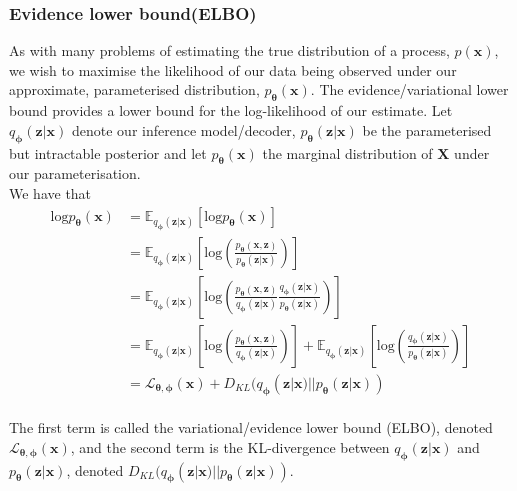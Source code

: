 \documentclass{article}
\theoremstyle{definition}
\begin{document}
\subsubsection{Evidence lower bound(ELBO)}
As with many problems of estimating the true distribution of a process, $p(\mathbf{x})$, we wish to maximise the likelihood of our data being observed under our approximate, parameterised distribution, $p_{\boldsymbol{\theta}}(\mathbf{x})$. The evidence/variational lower bound provides a lower bound for the log-likelihood of our estimate. Let $q_{\boldsymbol{\phi}}(\mathbf{z}|\mathbf{x})$ denote our inference model/decoder, $p_{\boldsymbol{\theta}}(\mathbf{z}|\mathbf{x})$ be the parameterised but intractable posterior and let $p_{\boldsymbol{\theta}}(\mathbf{x})$ the marginal distribution of $\mathbf{X}$ under our parameterisation.\\ We have that 
\begin{align}
\text{log}p_{\boldsymbol{\theta}}(\mathbf{x})
&= \mathbb{E}_{q_{\boldsymbol{\phi}}(\mathbf{z}|\mathbf{x})}\left[\text{log}p_{\boldsymbol{\theta}}(\mathbf{x})\right]\\
&=\mathbb{E}_{q_{\boldsymbol{\phi}}(\mathbf{z}|\mathbf{x})}\left[\text{log}\left(\frac{p_{\boldsymbol{\theta}}(\mathbf{x}, \mathbf{z})}{p_{\boldsymbol{\theta}}(\mathbf{z}|\mathbf{x})}\right)\right]\\
&=\mathbb{E}_{q_{\boldsymbol{\phi}}(\mathbf{z}|\mathbf{x})}\left[\text{log}\left(\frac{p_{\boldsymbol{\theta}}(\mathbf{x}, \mathbf{z})}{q_{\boldsymbol{\phi}}(\mathbf{z}|\mathbf{x})}\frac{q_{\boldsymbol{\phi}}(\mathbf{z}|\mathbf{x})}{p_{\boldsymbol{\theta}}(\mathbf{z}|\mathbf{x})}\right)\right]\\
&=\mathbb{E}_{q_{\boldsymbol{\phi}}(\mathbf{z}|\mathbf{x})}\left[\text{log}\left(\frac{p_{\boldsymbol{\theta}}(\mathbf{x}, \mathbf{z})}{q_{\boldsymbol{\phi}}(\mathbf{z}|\mathbf{x})}\right)\right]+\mathbb{E}_{q_{\boldsymbol{\phi}}(\mathbf{z}|\mathbf{x})}\left[\text{log}\left(\frac{q_{\boldsymbol{\phi}}(\mathbf{z}|\mathbf{x})}{p_{\boldsymbol{\theta}}(\mathbf{z}|\mathbf{x})}\right)\right]\\
&=\mathcal{L}_{\boldsymbol{\theta}, \boldsymbol{\phi}}(\mathbf{x})+D_{KL}(q_{\boldsymbol{\phi}}(\mathbf{z}|\mathbf{x})||p_{\boldsymbol{\theta}}(\mathbf{z}|\mathbf{x}))
\end{align}
\\
The first term is called the variational/evidence lower bound (ELBO), denoted $\mathcal{L}_{\boldsymbol{\theta}, \boldsymbol{\phi}}(\mathbf{x})$, and the second term is the KL-divergence between $q_{\boldsymbol{\phi}}(\mathbf{z}|\mathbf{x})$ and $p_{\boldsymbol{\theta}}(\mathbf{z}|\mathbf{x})$, denoted $D_{KL}(q_{\boldsymbol{\phi}}(\mathbf{z}|\mathbf{x})||p_{\boldsymbol{\theta}}(\mathbf{z}|\mathbf{x})).$\\\\
\end{document}
